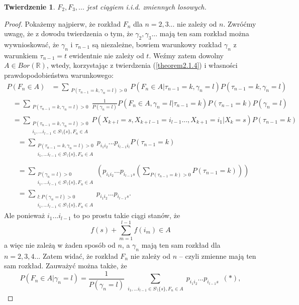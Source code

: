 \documentclass[a4paper]{article}
\theoremstyle{defn}
\theoremstyle{theorem}
\newtheorem{theorem}[defn]{Twierdzenie}
\theoremstyle{lemma}
\theoremstyle{cor}
\theoremstyle{fact}
\begin{document}
\begin{theorem}\label{theorem2.6.3}
$F_2, F_3,...$ jest ciągiem i.i.d. zmiennych losowych.
\end{theorem}
\begin{proof}Pokażemy najpierw, że rozkład $F_n$ dla $n=2,3...$ nie zależy od $n$. Zwróćmy uwagę, że z dowodu twierdzenia o tym, że $\gamma_2, \gamma_3...$ mają ten sam rozkład można wywnioskować, że $\gamma_n$ i $\tau_{n-1}$ są niezależne, bowiem warunkowy rozkład $\gamma_n$ z warunkiem $\tau_{n-1} = t$ ewidentnie nie zależy od $t$. Weźmy zatem dowolny $A \in Bor(\mathbb{R})$, wtedy, korzystając z twierdzenia (\ref{theorem2.1.4}) i własności prawdopodobieństwa warunkowego:
\begin{align*}
 P(F_n \in A) &= \sum\limits_{\substack{P(\tau_{n-1} = k, \gamma_{n} = l) > 0}} P(F_n \in A |\tau_{n-1} = k, \gamma_{n} = l)P(\tau_{n-1} = k, \gamma_{n} = l)
 \end{align*}
 \begin{align*}
 &=\sum\limits_{\substack{P(\tau_{n-1} = k, \gamma_{n} = l) > 0}} \frac{1}{P(\gamma_{n} = l)} P(F_n \in A, \gamma_{n} = l |\tau_{n-1} = k)P(\tau_{n-1} = k) P(\gamma_{n} = l)
 \end{align*}
 \begin{align*}
 &=\sum\limits_{\substack{P(\tau_{n-1} = k, \gamma_{n} = l) > 0\\i_1, ... i_{l-1} \in S\setminus \{s\}, F_n \in A}} P(X_{k+l} = s, X_{k+l-1} = i_{l-1} ..., X_{k+1} = i_1|X_{k} = s)P(\tau_{n-1} = k)
 \end{align*}
 \begin{align*}
 &= \sum\limits_{\substack{P(\tau_{n-1} = k, \gamma_{n} = l) > 0\\i_1, ... i_{l-1} \in S\setminus \{s\}, F_n \in A}} p_{i_1 i_2} ... p_{i_{l-1}i_l}P(\tau_{n-1} = k) \\\\
 &=\sum\limits_{\substack{P(\gamma_{n} = l) > 0\\i_1, ... i_{l-1} \in S\setminus \{s\},  F_n \in A}} \left( p_{i_1 i_2} ... p_{i_{l-1}s} \left( \sum\limits_{P(\tau_{n-1} = k) > 0} P(\tau_{n-1} = k)\right) \right) \\
 &= \sum\limits_{\substack{l: P(\gamma_{n} = l) > 0\\i_1, ... i_{l-1} \in S\setminus \{s\},  F_n \in A}} p_{i_1 i_2} ... p_{i_{l-1}s}.
\end{align*}
Ale ponieważ $i_1 ... i_{l-1}$ to po prostu takie ciągi stanów, że $$f(s) + \sum\limits_{m = 1}^{l-1} f(i_m) \in A$$
a więc nie zależą w żaden sposób od $n$, a $\gamma_n$ mają ten sam rozkład dla $n=2,3,4...$ Zatem widać, że rozkład $F_n$ nie zależy od $n$ – czyli zmienne mają ten sam rozkład. Zauważyć można także, że $$P(F_n \in A|\gamma_n = l) = \frac{1}{P(\gamma_{n} = l)} \sum\limits_{\substack{i_1, ... i_{l-1} \in S \setminus \{s\}, F_n \in A }} p_{i_1 i_2} ... p_{i_{l-1}s}\,\,\,(*),$$

\end{proof}
\end{document}
